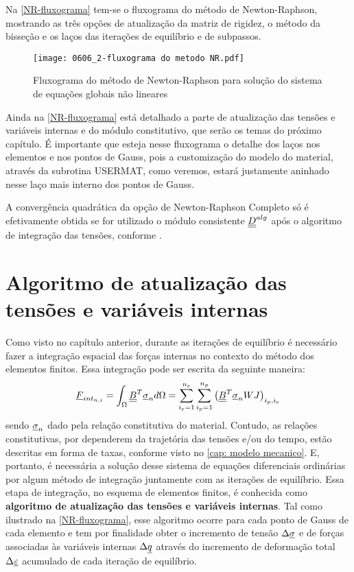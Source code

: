 Na \autoref{NR-fluxograma} tem-se o fluxograma do método de Newton-Raphson, mostrando as três opções de atualização da matriz de rigidez, o método da bisseção e os laços das iterações de equilíbrio e de subpassos.
\begin{figure}[H]
	\begin{center}
		\texttt{[image: 0606\_2-fluxograma do metodo NR.pdf]}
	\end{center}
	\caption{\label{NR-fluxograma}Fluxograma do método de Newton-Raphson para solução do sistema de equações globais não lineares}
\end{figure}
Ainda na \autoref{NR-fluxograma} está detalhado a parte de atualização das tensões e variáveis internas e do módulo constitutivo, que serão os temas do próximo capítulo. É importante que esteja nesse fluxograma o detalhe dos laços nos elementos e nos pontos de Gauss, pois a customização do modelo do material, através da subrotina USERMAT, como veremos, estará justamente aninhado nesse laço mais interno dos pontos de Gauss.

A convergência quadrática da opção de Newton-Raphson Completo só é efetivamente obtida se for utilizado o módulo consistente $\underline{\underline D}^{alg}$ após o algoritmo de integração das tensões, conforme .

\section{Algoritmo de atualização das tensões e variáveis internas}

Como visto no capítulo anterior, durante as iterações de equilíbrio é necessário fazer a integração espacial das forças internas no contexto do método dos elementos finitos. Essa integração pode ser escrita da seguinte maneira:
\begin{equation}
	\label{eq:Fint}
	\underline{F}_{int_{n,i}} = \int_{\Omega}\underline{\underline B}^T\underline \sigma_{n}d\Omega = \sum_{i_e=1}^{n_e}\sum_{i_p=1}^{n_p}\left( \underline{\underline B}^T\underline \sigma_{n}WJ\right)_{i_p,i_e}
\end{equation}
sendo $\underline \sigma_{n}$ dado pela relação constitutiva do material. Contudo, as relações constitutivas, por dependerem da trajetória das tensões e/ou do tempo, estão descritas em forma de taxas, conforme visto no \autoref{cap: modelo mecanico}. E, portanto, é necessária a solução desse sistema de equações diferenciais ordinárias por algum método de integração juntamente com as iterações de equilíbrio. Essa etapa de integração, no esquema de elementos finitos, é conhecida como \textbf{algoritmo de atualização das tensões e variáveis internas}. Tal como ilustrado na \autoref{NR-fluxograma}, esse algoritmo ocorre para cada ponto de Gauss de cada elemento e tem por finalidade obter o incremento de tensão $\Delta \underline \sigma$ e de forças associadas às variáveis internas $\Delta \underline q$ através do incremento de deformação total $\Delta \underline{\varepsilon}$ acumulado de cada iteração de equilíbrio.

